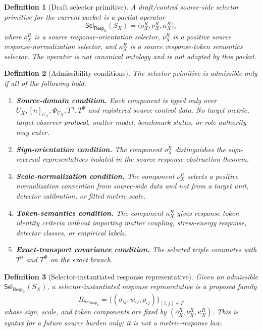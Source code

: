 \documentclass[11pt]{article}
\newcommand{\RespLC}{\mathsf{Resp}_{\mathrm{lc}}}
\newcommand{\SelResp}{\mathsf{Sel}_{\RespLC}}
\newtheorem{definition}{Definition}
\begin{document}
\begin{definition}[Draft selector primitive]
A draft/control source-side selector primitive for the current packet
is a partial operator
\[
    \SelResp(S_X)
    =
    \bigl(o^R_X,\nu^R_X,\kappa^R_X\bigr),
\]
where \(o^R_X\) is a source response-orientation selector,
\(\nu^R_X\) is a positive source response-normalization selector, and
\(\kappa^R_X\) is a source response-token semantics selector. The
operator is not canonical ontology and is not adopted by this packet.
\end{definition}

\begin{definition}[Admissibility conditions]
The selector primitive is admissible only if all of the following hold.
\begin{enumerate}
    \item \textbf{Source-domain condition.} Each component is typed
    only over \(U_X,[n]_{U_X},\Phi_{U_X},T^n,T^\Phi\) and registered
    source-control data. No target metric, target observer protocol,
    matter model, benchmark status, or role authority may enter.
    \item \textbf{Sign-orientation condition.} The component \(o^R_X\)
    distinguishes the sign-reversal representatives isolated in the
    source-response obstruction theorem.
    \item \textbf{Scale-normalization condition.} The component
    \(\nu^R_X\) selects a positive normalization convention from
    source-side data and not from a target unit, detector calibration,
    or fitted metric scale.
    \item \textbf{Token-semantics condition.} The component
    \(\kappa^R_X\) gives response-token identity criteria without
    importing matter coupling, stress-energy response, detector
    classes, or empirical labels.
    \item \textbf{Exact-transport covariance condition.} The selected
    triple commutes with \(T^n\) and \(T^\Phi\) on the exact branch.
\end{enumerate}
\end{definition}

\begin{definition}[Selector-instantiated response representative]
Given an admissible \(\SelResp(S_X)\), a selector-instantiated
response representative is a proposed family
\[
    R_{\SelResp}
    =
    \{(\sigma_{ij},w_{ij},\rho_{ij})\}_{(i,j)\in P}
\]
whose sign, scale, and token components are fixed by
\((o^R_X,\nu^R_X,\kappa^R_X)\). This is syntax for a future source
burden only; it is not a metric-response law.
\end{definition}
\end{document}
